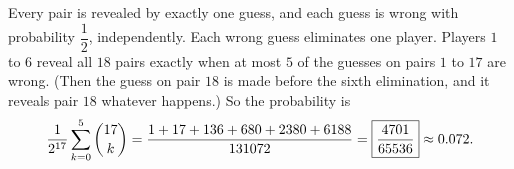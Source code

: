 Every pair is revealed by exactly one guess, and each guess is wrong with probability $\dfrac12$, independently. Each wrong guess eliminates one player. Players $1$ to $6$ reveal all $18$ pairs exactly when at most $5$ of the guesses on pairs $1$ to $17$ are wrong. (Then the guess on pair $18$ is made before the sixth elimination, and it reveals pair $18$ whatever happens.) So the probability is
\[\dfrac{1}{2^{17}}\sum_{k=0}^{5}\dbinom{17}{k}=\dfrac{1+17+136+680+2380+6188}{131072}=\boxed{\dfrac{4701}{65536}}\approx0.072.\]
